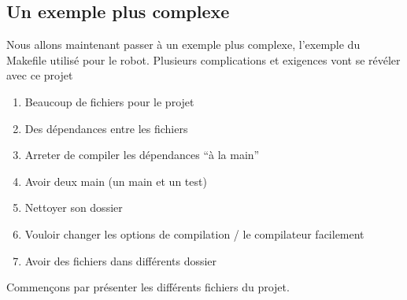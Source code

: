\documentclass[a4paper,10pt]{article}
\begin{document}
\begin{spacing}{1.5}
\subsection*{Un exemple plus complexe}
Nous allons maintenant passer à un exemple plus complexe, l'exemple du Makefile
utilisé pour le robot. Plusieurs complications et exigences vont se révéler avec ce projet
\begin{enumerate}
\item Beaucoup de fichiers pour le projet
\item Des dépendances entre les fichiers
\item Arreter de compiler les dépendances ``à la main''
\item Avoir deux main (un main et un test)
\item Nettoyer son dossier
\item Vouloir changer les options de compilation / le compilateur facilement
\item Avoir des fichiers dans différents dossier
\end{enumerate}
Commençons par présenter les différents fichiers du projet.
\newpage
\begin{multicols}{2}
\begin{center}
\end{center}


\end{multicols}
\end{spacing}
\end{document}
